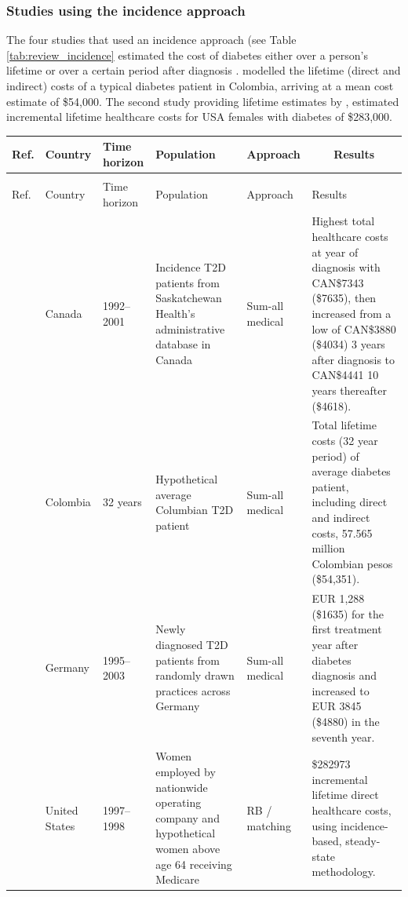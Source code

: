 \subsubsection*{Studies using the incidence approach}
The four studies that used an incidence approach (see Table \ref{tab:review_incidence} estimated the cost of diabetes either over a person's lifetime \parencite{Gonzalez2009b,Birnbaum2003c} or over a certain period after diagnosis \textcite{Johnson2006d,Martin2007b}. \textcite{Gonzalez2009b} modelled the lifetime (direct and indirect) costs of a typical diabetes patient in Colombia, arriving at a mean cost estimate of \$54,000. The second study providing lifetime estimates by \textcite{Birnbaum2003c}, estimated incremental lifetime healthcare costs for USA females with diabetes of \$283,000.



\begin{tabularx}{\linewidth}{m m m b m b}
\caption{Incidence studies on the costs of diabetes}\label{tab:review_incidence}\\
\toprule
Ref. &  Country & Time horizon & Population & Approach & \multicolumn{1}{c}{Results} \\
 \midrule \endfirsthead
\caption{Incidence studies on the costs of diabetes}\\
\toprule
Ref. &  Country & Time horizon & Population & Approach & Results   \\ \midrule \endhead
\textcite{Johnson2006d} &  Canada & 1992--2001 & Incidence T2D patients from Saskatchewan Health's administrative database in Canada & Sum-all medical & Highest  total healthcare costs at year of diagnosis with CAN\$7343 (\$7635), then increased from a low of CAN\$3880 (\$4034) 3 years after diagnosis to CAN\$4441   10 years thereafter (\$4618). \\
	\textcite{Gonzalez2009b} & Colombia & 32 years & Hypothetical average Columbian T2D patient & Sum-all medical & Total lifetime costs (32 year  period) of average diabetes patient, including direct and indirect costs,  57.565 million Colombian pesos (\$54,351). \\
\textcite{Martin2007b} & Germany & 1995--2003 & Newly  diagnosed T2D patients from randomly drawn practices across Germany & Sum-all medical & EUR 1,288   (\$1635) for the first treatment year after diabetes diagnosis and increased   to EUR 3845 (\$4880) in the seventh year. \\
\textcite{Birnbaum2003c} & United  States & 1997--1998 & Women employed by nationwide operating company and hypothetical women above age 64 receiving Medicare & RB / matching & \$282973 incremental lifetime direct healthcare costs, using incidence-based, steady-state methodology. \\ \bottomrule
\end{tabularx}



